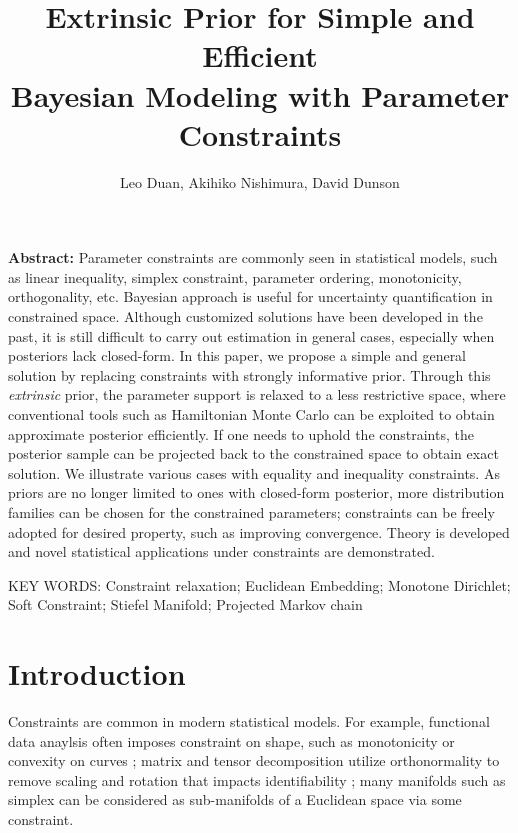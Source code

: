 \documentclass[10pt]{article}
\title{\textbf{Extrinsic Prior for Simple and Efficient\\ Bayesian Modeling with Parameter Constraints}}
\author{Leo Duan, Akihiko Nishimura, David Dunson}
\date{}
\DeclareMathOperator{\1}{\mathbbm{1}}
\begin{document}
\maketitle


{\bf Abstract:} Parameter constraints are commonly seen in statistical models, such as linear inequality, simplex constraint, parameter ordering, monotonicity, orthogonality, etc. Bayesian approach is useful for uncertainty quantification in constrained space. Although customized solutions have been developed in the past, it is still difficult to carry out estimation in general cases, especially when posteriors lack closed-form. In this paper, we propose a simple and general solution by replacing constraints with strongly informative prior. Through this {\it extrinsic} prior, the parameter support is relaxed to a less restrictive space, where conventional tools such as Hamiltonian Monte Carlo can be exploited to obtain approximate posterior efficiently. If one needs to uphold the constraints, the posterior sample can be projected back to the constrained space to obtain exact solution. We illustrate various cases with equality and inequality constraints. As priors are no longer limited to ones with closed-form posterior, more distribution families can be chosen for the constrained parameters; constraints can be freely adopted for desired property, such as improving convergence. Theory is developed and novel statistical applications under constraints are demonstrated.
\vskip 12pt

{\noindent  KEY WORDS:  Constraint relaxation; Euclidean Embedding; Monotone Dirichlet;  Soft Constraint; Stiefel Manifold; Projected Markov chain}
{}

\section{Introduction}

Constraints are common in modern statistical models. For example, functional data anaylsis often imposes constraint on shape, such as monotonicity or convexity on curves \citep{kelly1990monotone}; matrix and tensor decomposition utilize orthonormality to remove scaling and rotation that impacts identifiability \citep{uschmajew2010well}; many manifolds such as simplex can be considered as sub-manifolds of a Euclidean space via some constraint.
\end{document}
